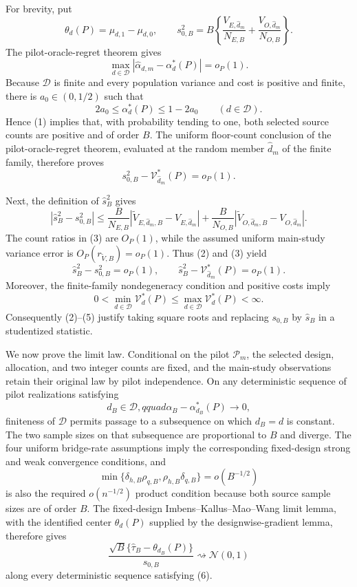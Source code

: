 For brevity, put
\[
 \theta_d(P)=\mu_{d,1}-\mu_{d,0},\qquad
 s_{0,B}^2
 =B\left\{\frac{V_{E,\widehat d_m}}{N_{E,B}}
          +\frac{V_{O,\widehat d_m}}{N_{O,B}}\right\}.
\]
The pilot-oracle-regret theorem gives
\[
 \max_{d\in\mathcal D}
 |\widehat\alpha_{d,m}-\alpha_d^*(P)|=o_P(1).                     \tag{1}
\]
Because \(\mathcal D\) is finite and every population variance and cost is positive and finite, there is \(a_0\in(0,1/2)\) such that
\[
 2a_0\leq\alpha_d^*(P)\leq1-2a_0
 \qquad(d\in\mathcal D).
\]
Hence (1) implies that, with probability tending to one, both selected source counts are positive and of order \(B\).  The uniform floor-count conclusion of the pilot-oracle-regret theorem, evaluated at the random member \(\widehat d_m\) of the finite family, therefore proves
\[
 s_{0,B}^2-\mathcal V_{\widehat d_m}^*(P)=o_P(1).                  \tag{2}
\]

Next, the definition of \(\widehat s_B^2\) gives
\[
 |\widehat s_B^2-s_{0,B}^2|
 \leq \frac{B}{N_{E,B}}
       |\widetilde V_{E,\widehat d_m,B}-V_{E,\widehat d_m}|
     +\frac{B}{N_{O,B}}
       |\widetilde V_{O,\widehat d_m,B}-V_{O,\widehat d_m}|.      \tag{3}
\]
The count ratios in (3) are \(O_P(1)\), while the assumed uniform main-study variance error is
\(O_P(r_{\widetilde V,B})=o_P(1)\).  Thus (2) and (3) yield
\[
 \widehat s_B^2-s_{0,B}^2=o_P(1),\qquad
 \widehat s_B^2-\mathcal V_{\widehat d_m}^*(P)=o_P(1).             \tag{4}
\]
Moreover, the finite-family nondegeneracy condition and positive costs imply
\[
 0<\min_{d\in\mathcal D}\mathcal V_d^*(P)
 \leq\max_{d\in\mathcal D}\mathcal V_d^*(P)<\infty.              \tag{5}
\]
Consequently (2)--(5) justify taking square roots and replacing \(s_{0,B}\) by \(\widehat s_B\) in a studentized statistic.

We now prove the limit law.  Conditional on the pilot \(\mathcal P_m\), the selected design, allocation, and two integer counts are fixed, and the main-study observations retain their original law by pilot independence.  On any deterministic sequence of pilot realizations satisfying
\[
 d_B\in\mathcal D,qquad
 \alpha_B-\alpha_{d_B}^*(P)\longrightarrow0,                      \tag{6}
\]
finiteness of \(\mathcal D\) permits passage to a subsequence on which \(d_B=d\) is constant.  The two sample sizes on that subsequence are proportional to \(B\) and diverge.  The four uniform bridge-rate assumptions imply the corresponding fixed-design strong and weak convergence conditions, and
\[
 \min\{\delta_{h,B}\rho_{q,B},
        \rho_{h,B}\delta_{q,B}\}=o(B^{-1/2})
\]
is also the required \(o(n^{-1/2})\) product condition because both source sample sizes are of order \(B\).  The fixed-design Imbens--Kallus--Mao--Wang limit lemma, with the identified center \(\theta_d(P)\) supplied by the designwise-gradient lemma, therefore gives
\[
 \frac{\sqrt B\{\widehat\tau_B-\theta_{d_B}(P)\}}{s_{0,B}}
 \rightsquigarrow\mathcal N(0,1)                                 \tag{7}
\]
along every deterministic sequence satisfying (6).

